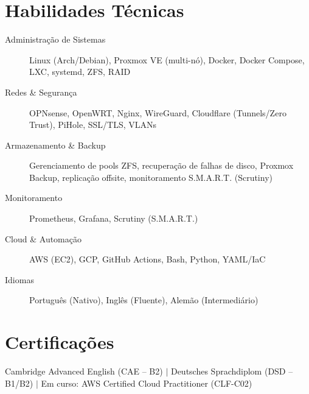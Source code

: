 \documentclass[10pt]{article}
\begin{document}
\section{Habilidades T\'{e}cnicas}
\begin{description}
	\item[Administra\c{c}\~{a}o de Sistemas] Linux (Arch/Debian), Proxmox VE (multi-n\'{o}), Docker, Docker Compose, LXC, systemd, ZFS, RAID
	\item[Redes \& Seguran\c{c}a] OPNsense, OpenWRT, Nginx, WireGuard, Cloudflare (Tunnels/Zero Trust), PiHole, SSL/TLS, VLANs
	\item[Armazenamento \& Backup] Gerenciamento de pools ZFS, recupera\c{c}\~{a}o de falhas de disco, Proxmox Backup, replica\c{c}\~{a}o offsite, monitoramento S.M.A.R.T. (Scrutiny)
	\item[Monitoramento] Prometheus, Grafana, Scrutiny (S.M.A.R.T.)
	\item[Cloud \& Automa\c{c}\~{a}o] AWS (EC2), GCP, GitHub Actions, Bash, Python, YAML/IaC
	\item[Idiomas] Portugu\^{e}s (Nativo), Ingl\^{e}s (Fluente), Alem\~{a}o (Intermedi\'{a}rio)
\end{description}

\section{Certifica\c{c}\~{o}es}
Cambridge Advanced English (CAE -- B2) $|$ Deutsches Sprachdiplom (DSD -- B1/B2) $|$ Em curso: AWS Certified Cloud Practitioner (CLF-C02)
\end{document}
